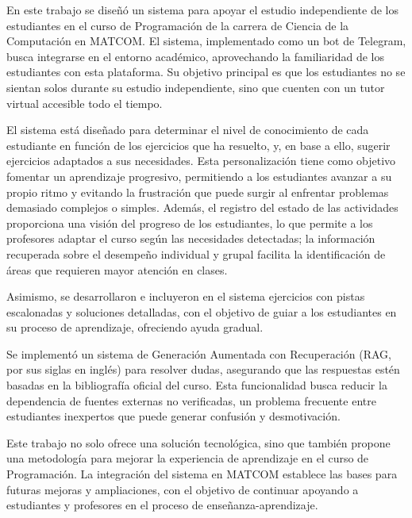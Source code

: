 \begin{conclusions}
En este trabajo se diseñó un sistema para apoyar el estudio independiente de los estudiantes en el curso de Programación de la carrera de Ciencia de la Computación en MATCOM. El sistema, implementado como un bot de Telegram, busca integrarse en el entorno académico, aprovechando la familiaridad de los estudiantes con esta plataforma. Su objetivo principal es que los estudiantes no se sientan solos durante su estudio independiente, sino que cuenten con un tutor virtual accesible todo el tiempo.

El sistema está diseñado para determinar el nivel de conocimiento de cada estudiante en función de los ejercicios que ha resuelto, y, en base a ello, sugerir ejercicios adaptados a sus necesidades. Esta personalización tiene como objetivo fomentar un aprendizaje progresivo, permitiendo a los estudiantes avanzar a su propio ritmo y evitando la frustración que puede surgir al enfrentar problemas demasiado complejos o simples. Además, el registro del estado de las actividades proporciona una visión del progreso de los estudiantes, lo que permite a los profesores adaptar el curso según las necesidades detectadas; la información recuperada sobre el desempeño individual y grupal facilita la identificación de áreas que requieren mayor atención en clases.

Asimismo, se desarrollaron e incluyeron en el sistema ejercicios con pistas escalonadas y soluciones detalladas, con el objetivo de guiar a los estudiantes en su proceso de aprendizaje, ofreciendo ayuda gradual.

Se implementó un sistema de Generación Aumentada con Recuperación (RAG, por sus siglas en inglés) para resolver dudas, asegurando que las respuestas estén basadas en la bibliografía oficial del curso. Esta funcionalidad busca reducir la dependencia de fuentes externas no verificadas, un problema frecuente entre estudiantes inexpertos que puede generar confusión y desmotivación.

Este trabajo no solo ofrece una solución tecnológica, sino que también propone una metodología para mejorar la experiencia de aprendizaje en el curso de Programación. La integración del sistema en MATCOM establece las bases para futuras mejoras y ampliaciones, con el objetivo de continuar apoyando a estudiantes y profesores en el proceso de enseñanza-aprendizaje.
\end{conclusions}
